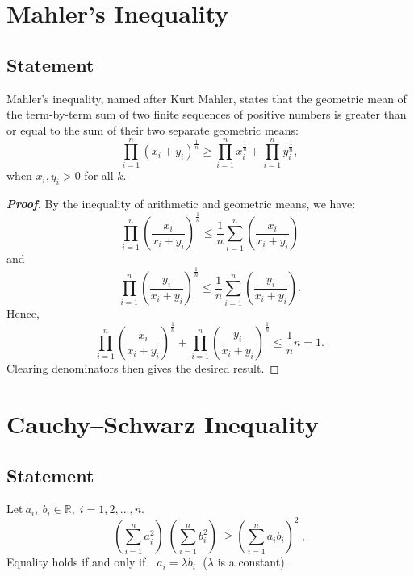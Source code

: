 \documentclass[a4paper]{report}
\begin{document}
\chapter{Mahler's Inequality}
\section{Statement}
\begin{thr}
Mahler's inequality, named after Kurt Mahler, states that the geometric mean of the term-by-term sum of two finite sequences of positive numbers is greater than or equal to the sum of their two separate geometric means:
\begin{equation}
\prod_{i=1}^n (x_i+y_i)^{\frac{1}{n}}\geqslant\prod_{i=1}^nx_i^{\frac{1}{n}}+\prod_{i=1}^ny_i^{\frac{1}{n}},
\end{equation}
when $x_i, y_i > 0$ for all $k$.
\end{thr}


\begin{proof}[\bf{Proof}]
By the inequality of arithmetic and geometric means, we have:
\[\prod_{i=1}^n\left( \frac{x_i}{x_i+y_i}\right)^{\frac{1}{n}}
\leqslant\frac{1}{n}\sum_{i=1}^n\left( \frac{x_i}{x_i+y_i}\right)\]
and
\[\prod_{i=1}^n\left( \frac{y_i}{x_i+y_i}\right)^{\frac{1}{n}}
\leqslant\frac{1}{n}\sum_{i=1}^n\left( \frac{y_i}{x_i+y_i}\right).\]
Hence,
\[\prod_{i=1}^n\left( \frac{x_i}{x_i+y_i}\right)^{\frac{1}{n}}+
\prod_{i=1}^n\left( \frac{y_i}{x_i+y_i}\right)^{\frac{1}{n}}\leqslant
\frac{1}{n} n=1 .\]
Clearing denominators then gives the desired result.
\end{proof}


\chapter{Cauchy–Schwarz Inequality}
	\section{Statement}

\begin{thr}

Let$\ a_i,\:b_i\in \mathbb{R},\;i=1,2,...,n.$
\begin{equation}
\left(\sum_{i=1}^n a_i^2\right)\;\left(\sum_{i=1}^n b_i^2\right) \;\geqslant
\left(\sum_{i=1}^n a_i b_i\right) ^2 \ , 
\end{equation}
Equality holds if and only if$\quad a_i=\lambda b_i\;$ ($\lambda$ is a constant). \par  
\end{thr}    
\end{document}

